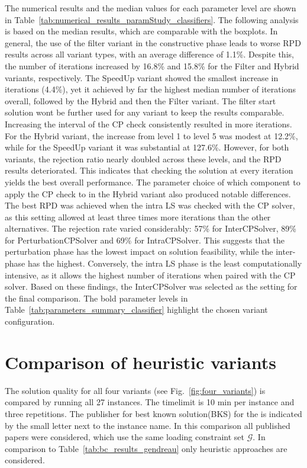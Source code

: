 The numerical results and the median values for each parameter level are shown in Table~\ref{tab:numerical_results_paramStudy_classifiers}.
The following analysis is based on the median results, which are comparable with the boxplots.
In general, the use of the filter variant in the constructive phase leads to worse RPD results across all variant types,
with an average difference of 1.1\%. Despite this, the number of iterations increased by 16.8\% and 15.8\% for the Filter and Hybrid variants,
respectively. The SpeedUp variant showed the smallest increase in iterations (4.4\%), yet it achieved by far the highest median
number of iterations overall, followed by the Hybrid and then the Filter variant. The filter start solution wont be further used for any variant to
keep the results comparable. Increasing the interval of the \gls{CP} check consistently resulted in more iterations. For the Hybrid variant,
the increase from level 1 to level 5 was modest at 12.2\%, while for the SpeedUp variant it was substantial at 127.6\%. However, for both
variants, the rejection ratio nearly doubled across these levels, and the RPD results deteriorated. This indicates that checking the solution
at every iteration yields the best overall performance. The parameter choice of which component to apply the \gls{CP} check to in the Hybrid variant also produced notable differences.
The best RPD was achieved when the intra \gls{LS} was checked with the \gls{CP} solver, as this setting allowed at least three times more
iterations than the other alternatives. The rejection rate varied considerably: 57\% for InterCPSolver, 89\% for PerturbationCPSolver
and 69\% for IntraCPSolver. This suggests that the perturbation phase has the lowest impact on solution feasibility, while the inter-phase
has the highest. Conversely, the intra \gls{LS} phase is the least computationally intensive, as it allows the highest number of iterations
when paired with the \gls{CP} solver. Based on these findings, the InterCPSolver was selected as the setting for the final comparison.
The bold parameter levels in Table~\ref{tab:parameters_summary_classifier} highlight the chosen variant configuration.

\section{Comparison of heuristic variants}
\label{sec:comparison_ils_variants}

The solution quality for all four variants (see Fig.~\ref{fig:four_variants}) is compared by running all 27 instances.
The timelimit is 10 min per instance and three repetitions.
The publisher for best known solution(BKS) for the \gendreauDataSetText is indicated by the small letter
next to the instance name. In this comparison all published papers were considered, which use the same loading constraint set $\mathcal{G}$.
In comparison to Table~\ref{tab:bc_results_gendreau} only heuristic approaches are considered.

